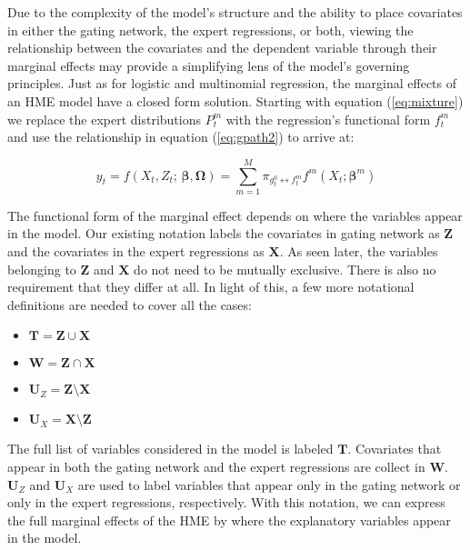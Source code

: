 \documentclass[12pt]{article}
\newcommand{\gateprod}[2]{\pi_{#1 \longleftrightarrow #2}}
\begin{document}
Due to the complexity of the model's structure and the ability to 
place covariates in either the gating network, the expert regressions,
or both, viewing the relationship between the covariates and the dependent
variable through their marginal effects may provide a simplifying lens of the 
model's governing principles. Just as for logistic and multinomial regression,
the marginal effects of an HME model have a closed form solution. Starting
with equation (\ref{eq:mixture}) we replace the expert distributions
$P^{m}_{t}$ with the regression's functional form $f^{m}_{t}$ and use
the relationship in equation (\ref{eq:gpath2}) to arrive at: 

\begin{equation} \label{eq:mixture2}
  y_{t} = f(X_{t}, Z_{t}; \, \boldsymbol{\beta}, \boldsymbol{\Omega}) = \sum_{m=1}^{M} \gateprod{g^{0}_{t}}{f^{m}_{t}} f^{m}(X_{t}; \boldsymbol{\beta}^{m})
\end{equation}

The functional form of the marginal effect depends on where the variables
appear in the model. Our existing notation labels the covariates in gating
network as $\boldsymbol{Z}$ and the covariates in the expert regressions 
as $\boldsymbol{X}$. As seen later, the variables belonging to
$\boldsymbol{Z}$ and $\boldsymbol{X}$ do not need to be mutually
exclusive. There is also no requirement that they differ at all.
In light of this, a few more notational definitions are needed to cover
all the cases:

\begin{itemize}  
  \item $\boldsymbol{T} = \boldsymbol{Z} \cup \boldsymbol{X}$
  \item $\boldsymbol{W} = \boldsymbol{Z} \cap \boldsymbol{X}$
  \item $\boldsymbol{U}_{Z} = \boldsymbol{Z} \setminus \boldsymbol{X}$
  \item $\boldsymbol{U}_{X} = \boldsymbol{X} \setminus \boldsymbol{Z}$
\end{itemize}


The full list of variables considered in the model is labeled $\boldsymbol{T}$.
Covariates that appear in both the gating network and the expert regressions
are collect in $\boldsymbol{W}$. $\boldsymbol{U}_{Z}$ and $\boldsymbol{U}_{X}$ are
used to label variables that appear only in the gating network or only in the expert
regressions, respectively. With this notation, we can express the full marginal effects
of the HME by where the explanatory variables appear in the model.
\end{document}
